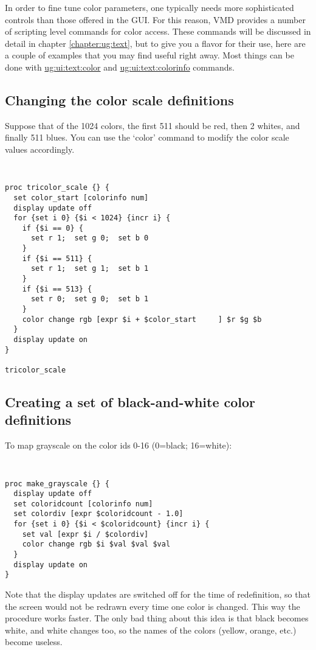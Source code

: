 In order to fine tune color parameters, one typically needs more
sophisticated controls than those offered in the GUI.  For this reason,
VMD provides a number of scripting level commands for color access.
These commands will be discussed in detail in 
chapter \ref{chapter:ug:text}, 
but to give
you a flavor for their use, here are a couple of examples that you
may find useful right away. Most things can be done with 
\hyperref{{\tt color}}{{\tt color} [\S}{] }{ug:ui:text:color}
and
\hyperref{{\tt colorinfo}}{{\tt colorinfo} [\S}{] }{ug:ui:text:colorinfo}
commands.

\subsection{Changing the color scale definitions}
Suppose that of the 1024 colors, the first 511 should be red, then 2 whites,
and finally 511 blues.  You can use the `color' command to modify the color
scale values accordingly.  

{\tt
\begin{verbatim}
proc tricolor_scale {} {
  set color_start [colorinfo num]
  display update off
  for {set i 0} {$i < 1024} {incr i} {
    if {$i == 0} {
      set r 1;  set g 0;  set b 0
    }
    if {$i == 511} {
      set r 1;  set g 1;  set b 1
    }
    if {$i == 513} {
      set r 0;  set g 0;  set b 1
    }
    color change rgb [expr $i + $color_start     ] $r $g $b
  }
  display update on
}

tricolor_scale
\end{verbatim}
}

\subsection{Creating a set of black-and-white color definitions}
\label{ug:topic:coloring:scripts:b-and-w}
To map grayscale on the color ids 0-16 (0=black; 16=white):
{\tt
\begin{verbatim}
proc make_grayscale {} {
  display update off
  set coloridcount [colorinfo num]
  set colordiv [expr $coloridcount - 1.0]
  for {set i 0} {$i < $coloridcount} {incr i} {
    set val [expr $i / $colordiv]
    color change rgb $i $val $val $val
  }
  display update on
}
\end{verbatim}
}
Note that the display updates are switched off for the time of
redefinition, so that the screen would not be redrawn every time one
color is changed.  This way the procedure works faster. The only bad
thing about this idea is that black becomes white, and white changes
too, so the names of the colors (yellow, orange, etc.)  become
useless.

